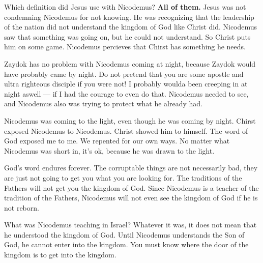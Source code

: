 \documentclass[12pt]{article}
\begin{document}
	Which definition did Jesus use with Nicodemus? \textbf{All of
	them.} Jesus was not condemning Nicodemus for not knowing. He
	was recognizing that the leadership of the nation did not
	understand the kingdom of God like Christ did. Nicodemus
	saw that something was going on, but he could not understand.
	So Christ puts him on some game. Nicodemus percieves that Chirst
	has something he needs.

	Zaydok has no problem with Nicodemus coming at night, because
	Zaydok would have probably came by night. Do not pretend that you
	are some apostle and ultra righteous disciple if you were not!
	I probably woulda been creeping in at night aswell --- if
	I had the courage to even do that. Nicodemus needed to see, and
	Nicodemus also was trying to protect what he already had.

	\begin{quote}
		\BibleJohnThreeEighteen{}
		\BibleJohnThreeNineteen{}
		\BibleJohnThreeTwenty{}
		\BibleJohnThreeTwentyOne{}
	\end{quote}

	Nicodemus was coming to the light, even though he was coming
	by night. Chirst exposed Nicodemus to Nicodemus. Christ showed
	him to himself. The word of God exposed me to me. We repented
	for our own ways. No matter what Nicodemus was short in, it's ok,
	because he was drawn to the light.

	\begin{quote}
		\BibleFirstPeterOneSeventeen{}
		\BibleFirstPeterOneEighteen{}
		\BibleFirstPeterOneNineteen{}
		\BibleFirstPeterOneTwenty{}
		\BibleFirstPeterOneTwentyOne{}
		\BibleFirstPeterOneTwentyTwo{}
		\BibleFirstPeterOneTwentyThree{}
		\BibleFirstPeterOneTwentyFour{}
		\BibleFirstPeterOneTwentyFive{}
	\end{quote}

	God's word endures forever. The corruptable things are not
	necessarily bad, they are just not going to get you what you
	are looking for. The traditions of the Fathers will not get
	you the kingdom of God. Since Nicodemus is a teacher of the
	tradition of the Fathers, Nicodemus will not even see the
	kingdom of God if he is not reborn.

	What was Nicodemus teaching in Israel? Whatever it was, it
	does not mean that he understood the kingdom of God. Until
	Nicodemus understands the Son of God, he cannot enter into 
	the kingdom. You must know where the door of the kingdom
	is to get into the kingdom.

	\begin{quote}
		\BiblePsalmThirtyTwoOne{}
		\BiblePsalmThirtyTwoTwo{}
	\end{quote}
\end{document}
